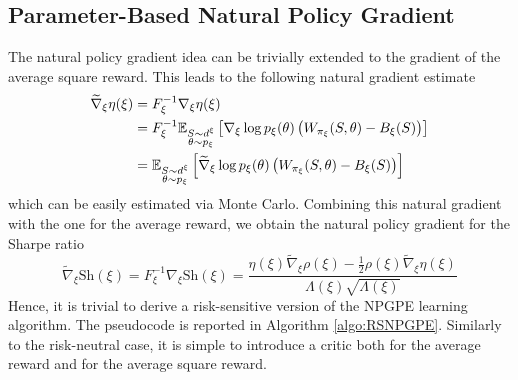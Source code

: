 \subsection{Parameter-Based Natural Policy Gradient}
The natural policy gradient idea can be trivially extended to the gradient of the average square reward. This leads to the following natural gradient estimate 
\begin{equation}
	\begin{split}
	\widetilde{\nabla}_\xi \eta(\xi) &=  F_\xi^{-1} \nabla_\xi \eta(\xi)\\
									 &=  F_\xi^{-1} \E[\substack{S \sim d^\xi\\\theta \sim p_\xi}]{\nabla_\xi \log p_\xi(\theta) \left(W_{\pi_\xi}(S, \theta) - B_\xi(S)\right)}\\
									 &=\E[\substack{S \sim d^\xi\\\theta \sim p_\xi}]{\widetilde{\nabla}_\xi \log p_\xi(\theta) \left(W_{\pi_\xi}(S, \theta) - B_\xi(S)\right)}
	\end{split}
\end{equation}
which can be easily estimated via Monte Carlo. Combining this natural gradient with the one for the average reward, we obtain the natural policy gradient for the Sharpe ratio
\begin{equation}
	\widetilde{\nabla}_\xi \text{Sh}(\xi) = F_\xi^{-1} \nabla_\xi \text{Sh}(\xi) = \frac{\eta(\xi) \widetilde{\nabla}_\xi \rho(\xi) - \frac{1}{2} \rho(\xi) \widetilde{\nabla}_\xi \eta(\xi)}{\Lambda(\xi) \sqrt{\Lambda(\xi)}}
\end{equation}
Hence, it is trivial to derive a risk-sensitive version of the NPGPE learning algorithm. The pseudocode is reported in Algorithm \ref{algo:RSNPGPE}. Similarly to the risk-neutral case, it is simple to introduce a critic both for the average reward and for the average square reward. 

